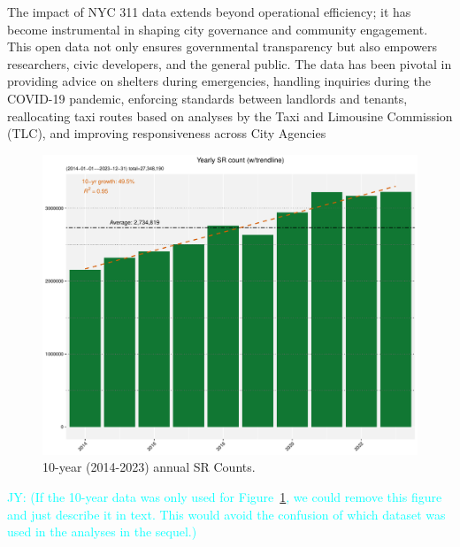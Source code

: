\documentclass[linenumber]{jdsart}
\newcommand{\jy}[1]{\textcolor{cyan}{JY: (#1)}}
\begin{document}

The impact of NYC 311 data extends beyond operational efficiency; it
has become instrumental in shaping city governance and community
engagement. This open data not only ensures governmental transparency
but also empowers researchers, civic developers, and the general
public. The data has been pivotal in providing advice on shelters
during emergencies, handling inquiries during the COVID-19 pandemic,
enforcing standards between landlords and tenants, reallocating taxi
routes based on analyses by the Taxi and Limousine Commission (TLC),
and improving responsiveness across City Agencies


\begin{figure}[tbp]
	\centering
  	\includegraphics[width = \textwidth]{10-year-trend_yearly.pdf}
 	\caption{10-year (2014-2023) annual SR Counts.}
  	\label{fig:10-yr}
\end{figure}

\jy{If the 10-year data was only used for Figure~\ref{fig:10-yr}, we
  could remove this figure and just describe it in text. This would
  avoid the confusion of which dataset was used in the analyses in the
  sequel.}
\end{document}
